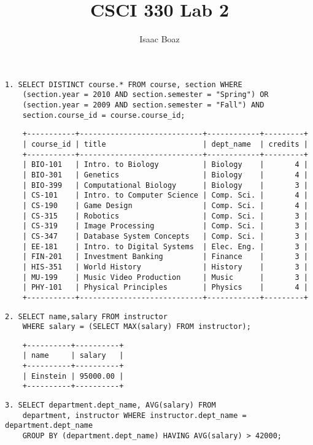 \documentclass{article}
\title{CSCI 330 Lab 2}
\author{Isaac Boaz}
\begin{document}
\maketitle

\lstset{
    language=SQL,
    basicstyle=\small,
    showstringspaces=false
}

\begin{lstlisting}
1. SELECT DISTINCT course.* FROM course, section WHERE
    (section.year = 2010 AND section.semester = "Spring") OR
    (section.year = 2009 AND section.semester = "Fall") AND
    section.course_id = course.course_id;
\end{lstlisting}
\begin{lstlisting}
    +-----------+----------------------------+------------+---------+
    | course_id | title                      | dept_name  | credits |
    +-----------+----------------------------+------------+---------+
    | BIO-101   | Intro. to Biology          | Biology    |       4 |
    | BIO-301   | Genetics                   | Biology    |       4 |
    | BIO-399   | Computational Biology      | Biology    |       3 |
    | CS-101    | Intro. to Computer Science | Comp. Sci. |       4 |
    | CS-190    | Game Design                | Comp. Sci. |       4 |
    | CS-315    | Robotics                   | Comp. Sci. |       3 |
    | CS-319    | Image Processing           | Comp. Sci. |       3 |
    | CS-347    | Database System Concepts   | Comp. Sci. |       3 |
    | EE-181    | Intro. to Digital Systems  | Elec. Eng. |       3 |
    | FIN-201   | Investment Banking         | Finance    |       3 |
    | HIS-351   | World History              | History    |       3 |
    | MU-199    | Music Video Production     | Music      |       3 |
    | PHY-101   | Physical Principles        | Physics    |       4 |
    +-----------+----------------------------+------------+---------+        
    \end{lstlisting}
\begin{lstlisting}
2. SELECT name,salary FROM instructor 
    WHERE salary = (SELECT MAX(salary) FROM instructor);
    \end{lstlisting}
\begin{lstlisting}
    +----------+----------+
    | name     | salary   |
    +----------+----------+
    | Einstein | 95000.00 |
    +----------+----------+
    \end{lstlisting}

\begin{lstlisting}
3. SELECT department.dept_name, AVG(salary) FROM
    department, instructor WHERE instructor.dept_name = department.dept_name
    GROUP BY (department.dept_name) HAVING AVG(salary) > 42000;
\end{lstlisting}
\end{document}
